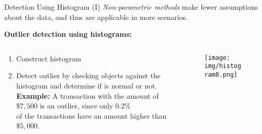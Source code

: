 \begin{frame}{Detection Using Histogram (I)}
	\textit{Non-parametric methods} make fewer assumptions about the data, and thus are applicable in more scenarios.\\\bigskip

	\textbf{Outlier detection using histograms:}
	\begin{columns}
		\begin{column}{0.7\textwidth}
			\vspace*{-1em}
			\begin{enumerate}
				\item Construct histogram
				\item Detect outlier by checking objects against the histogram and determine if is normal or not.\\
				      \textbf{Example:} A transaction with the amount of $\$7,500$ is an outlier, since only $0.2\%$ \\ of the transactions have an amount higher than $\$5,000$.
			\end{enumerate}
		\end{column}
		\begin{column}{0.3\textwidth}
			\begin{figure}
				\centering
				\texttt{[image: img/histogram8.png]}
			\end{figure}
		\end{column}
	\end{columns}
\end{frame}


